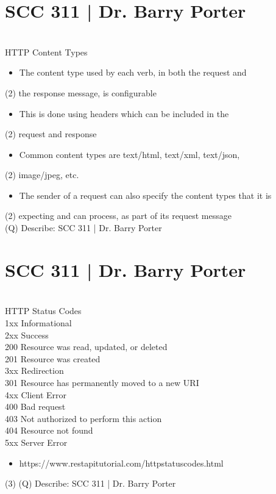 \documentclass[12pt]{article}
\begin{document}
\section{SCC 311 | Dr. Barry Porter}
\\
HTTP Content Types\\
\begin{itemize}
  \item The content type used by each verb, in both the request and 
\end{itemize}(2)
the response message, is configurable\\
\begin{itemize}
  \item This is done using headers which can be included in the 
\end{itemize}(2)
request and response\\
\begin{itemize}
  \item Common content types are text/html, text/xml, text/json, 
\end{itemize}(2)
image/jpeg, etc. \\
\begin{itemize}
  \item The sender of a request can also specify the content types that it is 
\end{itemize}(2)
expecting and can process, as part of its request message\\
\clearpage
(Q)
Describe: SCC 311 | Dr. Barry Porter
\clearpage
\section{SCC 311 | Dr. Barry Porter}
\\
HTTP Status Codes\\
1xx Informational\\
2xx Success\\
200 Resource was read, updated, or deleted\\
201 Resource was created\\
3xx Redirection\\
301 Resource has permanently moved to a new URI\\
4xx Client Error\\
400 Bad request\\
403 Not authorized to perform this action\\
404 Resource not found\\
5xx Server Error\\
\begin{itemize}
  \item https://www.restapitutorial.com/httpstatuscodes.html
\end{itemize}(3)
\clearpage
(Q)
Describe: SCC 311 | Dr. Barry Porter
\clearpage
\end{document}
